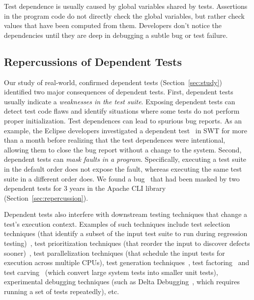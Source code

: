 Test dependence is usually caused by global variables shared by tests.
Assertions in the program code
do not directly check the global variables,
but rather check values that have been computed from
them.
Developers don't notice the dependencies until they are deep in debugging a
subtle bug or test failure.


\subsection{Repercussions of Dependent Tests}


Our study of \dtnum real-world, confirmed dependent
tests 
(Section~\ref{sec:study}) identified two 
major consequences of dependent tests.
%
First, dependent tests usually indicate a
\emph{weaknesses in the test suite}. Exposing
dependent tests can detect test code flaws and identify situations
where some tests do not perform proper initialization.
Test dependences can lead
to {spurious bug reports}. As an example, the Eclipse developers
investigated a dependent test~\cite{eclipsebug} in SWT for
more than a month before realizing that the test dependences were intentional,
allowing them to close the bug report without a change to the system.
%
Second, dependent tests can
\emph{mask faults in a program}. Specifically, executing a test suite in the
default order does not expose the fault, whereas
executing the same test suite in a different order does. We found 
a bug~\cite{clibug} that had been masked by two dependent tests
for 3 years in the Apache CLI library~\cite{cli} (Section~\ref{sec:repercussion}).


Dependent tests also interfere with downstream testing
techniques that change a test's execution context.
Examples of such techniques include
test selection techniques (that identify a subset of
the input test suite to run during
regression testing)~\cite{harroldetal:OOPSLA:2001},
test prioritization techniques (that reorder the
input to discover defects sooner)~\cite{Elbaum:2000:PTC:347324.348910},
test parallelization techniques (that schedule the input tests for execution across multiple
CPUs), test generation techniques~\cite{PachecoLET2007, SPLAT},
test factoring~\cite{Saff:2005} and test carving~\cite{Elbaum:2006} (which
convert large system tests into smaller unit tests),
experimental debugging techniques (such as Delta Debugging~\cite{Zeller:2002},
which requires running a set of tests repeatedly), etc. 

